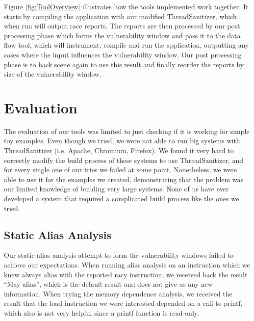 \documentclass{acm_proc_article-sp}
\begin{document}
Figure \ref{fig:ToolOverview} illustrates how the tools implemented work together. It starts by compiling the application with our modified ThreadSanitizer, which when run will output race reports. The reports are then processed by our post processing phase which forms the vulnerability window and pass it to the data flow tool, which will instrument, compile and run the application, outputting any cases where the input influences the vulnerability window. Our post processing phase is to back scene again to use this result and finally reorder the reports by size of the vulnerability window.

\begin{figure*}
\centering
{}
\caption{Tool Overview}
\label{fig:ToolOverview}
\end{figure*}


\section{Evaluation}

The evaluation of our tools was limited to just checking if it is working for simple toy examples. Even though we tried, we were not able to run big systems with ThreadSanitizer (i.e. Apache, Chromium, Firefox). We found it very hard to correctly modify the build process of these systems to use ThreadSanitizer, and for every single one of our tries we failed at some point. Nonetheless, we were able to use it for the examples we created, demonstrating that the problem was our limited knowledge of building very large systems. None of us have ever developed a system that required a complicated build process like the ones we tried.

\subsection{Static Alias Analysis}

Our static alias analysis attempt to form the vulnerability windows failed to achieve our expectations. When running alias analysis on an instruction which we knew always alias with the reported racy instruction, we received back the result “May alias”, which is the default result and does not give us any new information. When trying the memory dependence analysis, we received the result that the load instruction we were interested depended on a call to printf, which also is not very helpful since a printf function is read-only.
\end{document}
